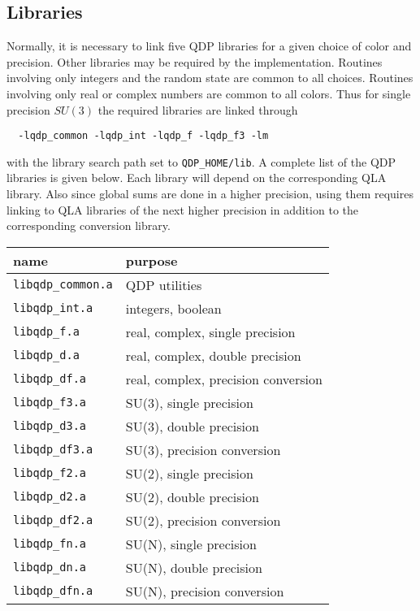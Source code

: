 \documentclass{article}
\newcommand{\ttdash}{{\tt \_}}
\begin{document}
\subsection{Libraries}

Normally, it is necessary to link five QDP libraries for a given
choice of color and precision.  Other libraries may be required by the
implementation.  Routines involving only integers and the random state
are common to all choices.  Routines involving only real or complex
numbers are common to all colors.  Thus for single precision $SU(3)$
the required libraries are linked through
%
\begin{verbatim}
  -lqdp_common -lqdp_int -lqdp_f -lqdp_f3 -lm
\end{verbatim}
%
with the library search path set to {\tt QDP}\ttdash{\tt HOME/lib}.
A complete list of the QDP libraries is given below.  Each library
will depend on the corresponding QLA library.
Also since global sums are done in a higher precision, using them
requires linking to QLA libraries of the next higher precision in
addition to the corresponding conversion library.

\begin{center}
\begin{tabular}{|l|l|}
\hline
 name & purpose \\
\hline
 {\tt libqdp}\ttdash{\tt common.a} & QDP utilities                       \\
 {\tt libqdp}\ttdash{\tt int.a}    & integers, boolean                   \\
 {\tt libqdp}\ttdash{\tt f.a  }    & real, complex, single precision     \\
 {\tt libqdp}\ttdash{\tt d.a  }    & real, complex, double precision     \\
 {\tt libqdp}\ttdash{\tt df.a }    & real, complex, precision conversion \\
 {\tt libqdp}\ttdash{\tt f3.a }    & SU(3), single precision             \\
 {\tt libqdp}\ttdash{\tt d3.a }    & SU(3), double precision             \\
 {\tt libqdp}\ttdash{\tt df3.a}    & SU(3), precision conversion         \\
 {\tt libqdp}\ttdash{\tt f2.a }    & SU(2), single precision             \\
 {\tt libqdp}\ttdash{\tt d2.a }    & SU(2), double precision             \\
 {\tt libqdp}\ttdash{\tt df2.a}    & SU(2), precision conversion         \\
 {\tt libqdp}\ttdash{\tt fn.a }    & SU(N), single precision             \\
 {\tt libqdp}\ttdash{\tt dn.a }    & SU(N), double precision             \\
 {\tt libqdp}\ttdash{\tt dfn.a}    & SU(N), precision conversion         \\
\hline
\end{tabular}
\end{center}
\end{document}
